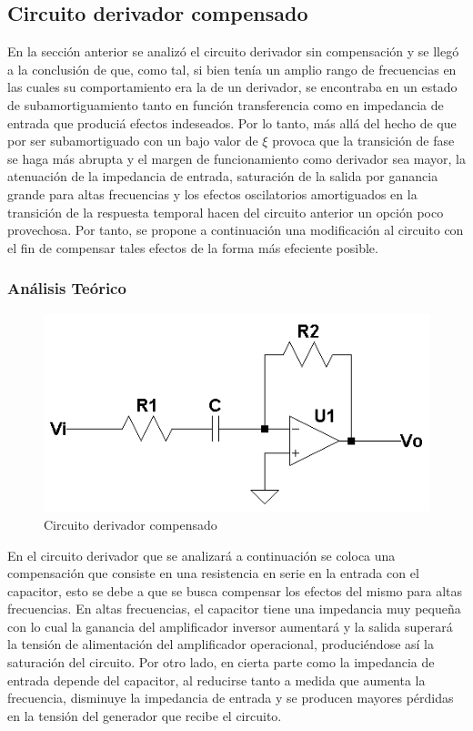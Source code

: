 	\subsection{Circuito derivador compensado}
En la secci\'on anterior se analiz\'o el circuito derivador sin compensaci\'on y se lleg\'o a la conclusi\'on de que, como tal,
si bien ten\'ia un amplio rango de frecuencias en las cuales su comportamiento era la de un derivador, se encontraba en un estado de subamortiguamiento
tanto en funci\'on transferencia como en impedancia de entrada que produci\'a efectos indeseados. Por lo tanto, m\'as all\'a del hecho de que por ser subamortiguado con un bajo
valor de $\xi$ provoca que la transici\'on de fase se haga m\'as abrupta y el margen de funcionamiento como derivador sea mayor, la atenuaci\'on de la impedancia de entrada, saturaci\'on de la salida por ganancia
grande para altas frecuencias y los efectos oscilatorios amortiguados en la transici\'on de la respuesta temporal hacen del circuito anterior un opci\'on poco provechosa.
Por tanto, se propone a continuaci\'on una modificaci\'on al circuito con el fin de compensar tales efectos de la forma m\'as efeciente posible.

\subsubsection{An\'alisis Te\'orico}

\begin{figure}[H]
	\centering
	\includegraphics[scale=0.7]{Recursos/Derivador_compensado/Circuito_derivador_compensado.png}
	\caption{Circuito derivador compensado}
	\label{fig:derivador_compensado_circuito}
\end{figure}

En el circuito derivador que se analizar\'a a continuaci\'on se coloca una compensaci\'on 
que consiste en una resistencia en serie en la entrada con el capacitor, esto se debe a que 
se busca compensar los efectos del mismo para altas frecuencias. En altas frecuencias, el 
capacitor tiene una impedancia muy peque\~na con lo cual la ganancia del amplificador 
inversor aumentar\'a y la salida superar\'a la tensi\'on de alimentaci\'on del 
amplificador operacional, produci\'endose as\'i la saturaci\'on del circuito. 
Por otro lado, en cierta parte como la impedancia de entrada depende del capacitor, al 
reducirse tanto a medida que aumenta la frecuencia, disminuye la impedancia de entrada 
y se producen mayores p\'erdidas en la tensi\'on del generador que recibe el circuito.

